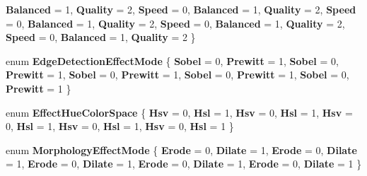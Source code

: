 \begin{DoxyCompactItemize}
{\bfseries Balanced} = 1, 
{\bfseries Quality} = 2, 
{\bfseries Speed} = 0, 
\newline
{\bfseries Balanced} = 1, 
{\bfseries Quality} = 2, 
{\bfseries Speed} = 0, 
{\bfseries Balanced} = 1, 
\newline
{\bfseries Quality} = 2, 
{\bfseries Speed} = 0, 
{\bfseries Balanced} = 1, 
{\bfseries Quality} = 2, 
\newline
{\bfseries Speed} = 0, 
{\bfseries Balanced} = 1, 
{\bfseries Quality} = 2
 \}
\item 
\mbox{\label{namespace_microsoft_1_1_graphics_1_1_canvas_1_1_effects_a587bd4a5e7bae1bcbe7620bbf9ac0959}} 
enum {\bfseries Edge\+Detection\+Effect\+Mode} \{ \newline
{\bfseries Sobel} = 0, 
{\bfseries Prewitt} = 1, 
{\bfseries Sobel} = 0, 
{\bfseries Prewitt} = 1, 
\newline
{\bfseries Sobel} = 0, 
{\bfseries Prewitt} = 1, 
{\bfseries Sobel} = 0, 
{\bfseries Prewitt} = 1, 
\newline
{\bfseries Sobel} = 0, 
{\bfseries Prewitt} = 1
 \}
\item 
\mbox{\label{namespace_microsoft_1_1_graphics_1_1_canvas_1_1_effects_ae7299c185ad53a8bf344202e319bf35a}} 
enum {\bfseries Effect\+Hue\+Color\+Space} \{ \newline
{\bfseries Hsv} = 0, 
{\bfseries Hsl} = 1, 
{\bfseries Hsv} = 0, 
{\bfseries Hsl} = 1, 
\newline
{\bfseries Hsv} = 0, 
{\bfseries Hsl} = 1, 
{\bfseries Hsv} = 0, 
{\bfseries Hsl} = 1, 
\newline
{\bfseries Hsv} = 0, 
{\bfseries Hsl} = 1
 \}
\item 
\mbox{\label{namespace_microsoft_1_1_graphics_1_1_canvas_1_1_effects_a41ef1609f91e4fdf47d735886d2d455b}} 
enum {\bfseries Morphology\+Effect\+Mode} \{ \newline
{\bfseries Erode} = 0, 
{\bfseries Dilate} = 1, 
{\bfseries Erode} = 0, 
{\bfseries Dilate} = 1, 
\newline
{\bfseries Erode} = 0, 
{\bfseries Dilate} = 1, 
{\bfseries Erode} = 0, 
{\bfseries Dilate} = 1, 
\newline
{\bfseries Erode} = 0, 
{\bfseries Dilate} = 1
 \}
\item 

\end{DoxyCompactItemize}
